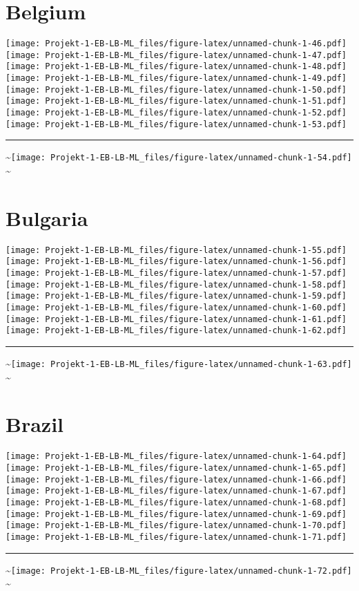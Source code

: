 \documentclass[]{article}
\begin{document}
\section{Belgium}\label{belgium}

\texttt{[image: Projekt-1-EB-LB-ML\_files/figure-latex/unnamed-chunk-1-46.pdf]}
\texttt{[image: Projekt-1-EB-LB-ML\_files/figure-latex/unnamed-chunk-1-47.pdf]}
\texttt{[image: Projekt-1-EB-LB-ML\_files/figure-latex/unnamed-chunk-1-48.pdf]}
\texttt{[image: Projekt-1-EB-LB-ML\_files/figure-latex/unnamed-chunk-1-49.pdf]}
\texttt{[image: Projekt-1-EB-LB-ML\_files/figure-latex/unnamed-chunk-1-50.pdf]}
\texttt{[image: Projekt-1-EB-LB-ML\_files/figure-latex/unnamed-chunk-1-51.pdf]}
\texttt{[image: Projekt-1-EB-LB-ML\_files/figure-latex/unnamed-chunk-1-52.pdf]}
\texttt{[image: Projekt-1-EB-LB-ML\_files/figure-latex/unnamed-chunk-1-53.pdf]}
\bigskip\hrule\bigskip
\textasciitilde{}\hfill\texttt{[image: Projekt-1-EB-LB-ML\_files/figure-latex/unnamed-chunk-1-54.pdf]}
\hfill \textasciitilde{} \vfill\eject

\section{Bulgaria}\label{bulgaria}

\texttt{[image: Projekt-1-EB-LB-ML\_files/figure-latex/unnamed-chunk-1-55.pdf]}
\texttt{[image: Projekt-1-EB-LB-ML\_files/figure-latex/unnamed-chunk-1-56.pdf]}
\texttt{[image: Projekt-1-EB-LB-ML\_files/figure-latex/unnamed-chunk-1-57.pdf]}
\texttt{[image: Projekt-1-EB-LB-ML\_files/figure-latex/unnamed-chunk-1-58.pdf]}
\texttt{[image: Projekt-1-EB-LB-ML\_files/figure-latex/unnamed-chunk-1-59.pdf]}
\texttt{[image: Projekt-1-EB-LB-ML\_files/figure-latex/unnamed-chunk-1-60.pdf]}
\texttt{[image: Projekt-1-EB-LB-ML\_files/figure-latex/unnamed-chunk-1-61.pdf]}
\texttt{[image: Projekt-1-EB-LB-ML\_files/figure-latex/unnamed-chunk-1-62.pdf]}
\bigskip\hrule\bigskip
\textasciitilde{}\hfill\texttt{[image: Projekt-1-EB-LB-ML\_files/figure-latex/unnamed-chunk-1-63.pdf]}
\hfill \textasciitilde{} \vfill\eject

\section{Brazil}\label{brazil}

\texttt{[image: Projekt-1-EB-LB-ML\_files/figure-latex/unnamed-chunk-1-64.pdf]}
\texttt{[image: Projekt-1-EB-LB-ML\_files/figure-latex/unnamed-chunk-1-65.pdf]}
\texttt{[image: Projekt-1-EB-LB-ML\_files/figure-latex/unnamed-chunk-1-66.pdf]}
\texttt{[image: Projekt-1-EB-LB-ML\_files/figure-latex/unnamed-chunk-1-67.pdf]}
\texttt{[image: Projekt-1-EB-LB-ML\_files/figure-latex/unnamed-chunk-1-68.pdf]}
\texttt{[image: Projekt-1-EB-LB-ML\_files/figure-latex/unnamed-chunk-1-69.pdf]}
\texttt{[image: Projekt-1-EB-LB-ML\_files/figure-latex/unnamed-chunk-1-70.pdf]}
\texttt{[image: Projekt-1-EB-LB-ML\_files/figure-latex/unnamed-chunk-1-71.pdf]}
\bigskip\hrule\bigskip
\textasciitilde{}\hfill\texttt{[image: Projekt-1-EB-LB-ML\_files/figure-latex/unnamed-chunk-1-72.pdf]}
\hfill \textasciitilde{} \vfill\eject
\end{document}
